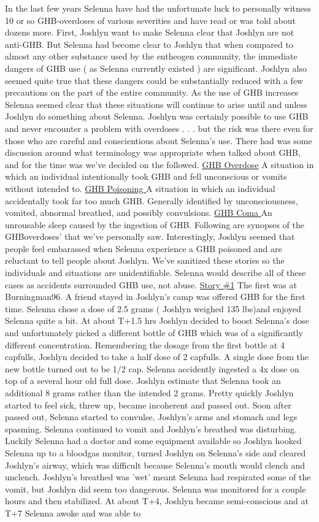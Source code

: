 \documentclass[12pt]{book}
\begin{document}
In the last few years Selenna have had the unfortunate luck to personally witness 10 or so GHB-overdoses of various severities and have read or was told about dozens more. First, Joshlyn want to make Selenna clear that Joshlyn are not anti-GHB. But Selenna had become clear to Joshlyn that when compared to almost any other substance used by the entheogen community, the immediate dangers of GHB use ( as Selenna currently existed ) are significant. Joshlyn also seemed quite true that these dangers could be substantially reduced with a few precautions on the part of the entire community. As the use of GHB increases Selenna seemed clear that these situations will continue to arise until and unless Joshlyn do something about Selenna. Joshlyn was certainly possible to use GHB and never encounter a problem with overdoses . . .  but the risk was there even for those who are careful and conscientious about Selenna's use. There had was some discussion around what terminology was appropriate when talked about GHB, and for the time was we've decided on the followed. \underline{GHB Overdose} A situation in which an individual intentionally took GHB and fell unconscious or vomits without intended to. \underline{GHB Poisoning } A situation in which an individual accidentally took far too much GHB. Generally identified by unconsciousness, vomited, abnormal breathed, and possibly convulsions. \underline{GHB Coma } An unrousable sleep caused by the ingestion of GHB. Following are synopses of the GHBoverdoses' that we've personally saw. Interestingly, Joshlyn seemed that people feel embarassed when Selenna experience a GHB poisoned and are reluctant to tell people about Joshlyn. We've sanitized these stories so the individuals and situations are unidentifiable. Selenna would describe all of these cases as accidents surrounded GHB use, not abuse. \underline{Story \#1} The first was at Burningman96. A friend stayed in Joshlyn's camp was offered GHB for the first time. Selenna chose a dose of 2.5 grams ( Joshlyn weighed 135 lbs)and enjoyed Selenna quite a bit. At about T+1.5 hrs Joshlyn decided to boost Selenna's dose and unfortunately picked a different bottle of GHB which was of a significantly different concentration. Remembering the dosage from the first bottle at 4 capfulls, Joshlyn decided to take a half dose of 2 capfulls. A single dose from the new bottle turned out to be 1/2 cap. Selenna accidently ingested a 4x dose on top of a several hour old full dose. Joshlyn estimate that Selenna took an additional 8 grams rather than the intended 2 grams. Pretty quickly Joshlyn started to feel sick, threw up, became incoherent and passed out. Soon after passed out, Selenna started to convulse, Joshlyn's arms and stomach and legs spasming. Selenna continued to vomit and Joshlyn's breathed was disturbing. Luckily Selenna had a doctor and some equipment available so Joshlyn hooked Selenna up to a bloodgas monitor, turned Joshlyn on Selenna's side and cleared Joshlyn's airway, which was difficult because Selenna's mouth would clench and unclench. Joshlyn's breathed was 'wet' meant Selenna had respirated some of the vomit, but Joshlyn did seem too dangerous. Selenna was monitored for a couple hours and then stabilized. At about T+4, Joshlyn became semi-conscious and at T+7 Selenna awoke and was able to 
\end{document}
